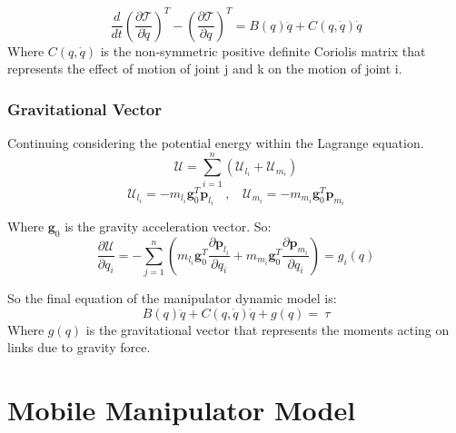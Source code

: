 \begin{equation}
	\frac{d}{dt}\left(\frac{\partial \mathcal{T}}{\partial\dot{q}}\right)^T-\left(\frac{\partial \mathcal{T}}{\partial q}\right)^T=B(q)\ddot{q}+C\left(q,\dot{q}\right)\dot{q}
\end{equation}
Where $C\left(q,\dot{q}\right)$ is the non-symmetric positive definite Coriolis matrix that represents the effect of motion of joint j and k on the motion of joint i. 
\subsubsection{Gravitational Vector}
Continuing considering the potential energy within the Lagrange equation.
\begin{equation*}
	\mathcal{U}=\sum_{i=1}^{n}{(\mathcal{U}_{l_i}+\mathcal{U}_{m_i})}
\end{equation*}
\begin{equation}
	\mathcal{U}_{l_i}=-m_{l_i}\mathbf{g}_0^T\mathbf{p}_{l_i}\ \ \ \ ,\ \ \ \ \mathcal{U}_{m_i}=-m_{m_i}\mathbf{g}_0^T\mathbf{p}_{m_i}
\end{equation}

Where $\mathbf{g}_0$ is the gravity acceleration vector. So:
\begin{equation}
	\frac{\partial \mathcal{U}}{\partial q_i}=-\sum_{j=1}^{n}\left(m_{l_i}\mathbf{g}_0^T\frac{{\partial\mathbf{p}}_{l_i}}{\partial q_i}+m_{m_i}\mathbf{g}_0^T\frac{{\partial\mathbf{p}}_{m_i}}{\partial q_i}\right)=g_i(q)
\end{equation}

So the final equation of the manipulator dynamic model is:
\large\begin{equation}\label{dynamics}
	B\left(q\right)\ddot{q}+C\left(q,\dot{q}\right)\dot{q}+g\left(q\right)=\ \tau
\end{equation}\normalsize
Where $g(q)$ is the gravitational vector that represents the moments acting on links due to gravity force.

\section{Mobile Manipulator Model}
